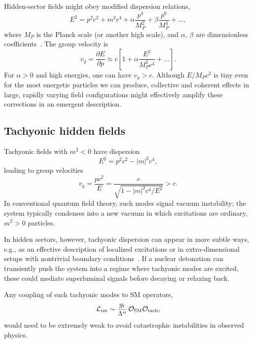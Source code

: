 \documentclass[aps,prd,twocolumn,nofootinbib,superscriptaddress]{revtex4-2}
\begin{document}
Hidden-sector fields might obey modified dispersion relations,
\begin{equation}
    E^2 = p^2 c^2 + m^2 c^4
        + \alpha \frac{p^4}{M_P^2}
        + \beta \frac{p^6}{M_P^4} + \dots,
    \label{eq:mdr}
\end{equation}
where $M_P$ is the Planck scale (or another high scale), and $\alpha$, $\beta$ are dimensionless coefficients~\cite{AmelinoCameliaLRR}. The group velocity is
\begin{equation}
    v_g = \frac{\partial E}{\partial p}
    \approx c \left[
    1 + \alpha \frac{E^2}{M_P^2 c^4} + \dots
    \right].
\end{equation}
For $\alpha > 0$ and high energies, one can have $v_g > c$. Although $E / M_P c^2$ is tiny even for the most energetic particles we can produce, collective and coherent effects in large, rapidly varying field configurations might effectively amplify these corrections in an emergent description.

\subsection{Tachyonic hidden fields}

Tachyonic fields with $m^2 < 0$ have dispersion
\begin{equation}
    E^2 = p^2 c^2 - |m|^2 c^4,
\end{equation}
leading to group velocities
\begin{equation}
    v_g = \frac{p c^2}{E} =
    \frac{c}{\sqrt{1 - |m|^2 c^4 / E^2}} > c.
\end{equation}
In conventional quantum field theory, such modes signal vacuum instability; the system typically condenses into a new vacuum in which excitations are ordinary, $m^2 > 0$ particles.

In hidden sectors, however, tachyonic dispersion can appear in more subtle ways, e.g., as an effective description of localized excitations or in extra-dimensional setups with nontrivial boundary conditions~\cite{Feinberg1967}. If a nuclear detonation can transiently push the system into a regime where tachyonic modes are excited, these could mediate superluminal signals before decaying or relaxing back.

Any coupling of such tachyonic modes to SM operators,
\begin{equation}
    \mathcal{L}_{\rm int} \sim
    \frac{g_t}{\Lambda^n} \,
    \mathcal{O}_{\rm SM} \mathcal{O}_{\rm tach},
\end{equation}
would need to be extremely weak to avoid catastrophic instabilities in observed physics.
\end{document}
